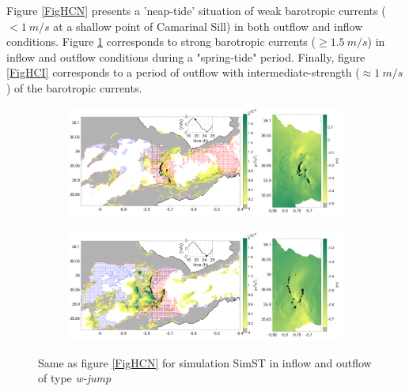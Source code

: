 Figure \ref{FigHCN} presents a \color{blue} 'neap-tide' situation \color{black} of weak barotropic currents ($<1\ m/s$ at a shallow point of Camarinal Sill) in \color{blue} both outflow and inflow conditions\color{black}. Figure \ref{FigHCS} \color{blue} corresponds to \color{black} strong barotropic currents ($\geq 1.5\ m/s$) in inflow and outflow conditions during a "spring-tide" period. Finally, figure \ref{FigHCI} corresponds to a period of outflow with intermediate-strength ($\approx 1\ m/s$) of the barotropic currents. \color{black}

\begin{figure}[!h]
 \centering
\begin{subfigure}{\linewidth}
\centering
\includegraphics[width=\linewidth]{./GBR3D/VE2_19h30_p.png}
\end{subfigure}

\begin{subfigure}{\linewidth}
\centering
\includegraphics[width=\linewidth]{./GBR3D/VE2_25h_p.png}
\end{subfigure}
\caption {Same as figure \ref{FigHCN} for simulation SimST in inflow and outflow of type \textit{w-jump}}
\label{FigHCS}
\end{figure}

